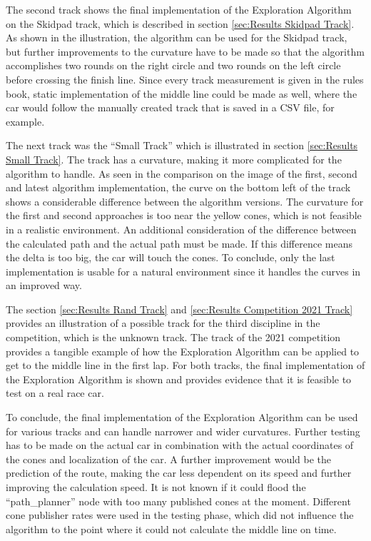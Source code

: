 The second track shows the final implementation of the Exploration Algorithm on the Skidpad track, which is described in section \ref{sec:Results Skidpad Track}. As shown in the illustration, the algorithm can be used for the Skidpad track, but further improvements to the curvature have to be made so that the algorithm accomplishes two rounds on the right circle and two rounds on the left circle before crossing the finish line. Since every track measurement is given in the rules book, static implementation of the middle line could be made as well, where the car would follow the manually created track that is saved in a CSV file, for example.

The next track was the ``Small Track'' which is illustrated in section \ref{sec:Results Small Track}. The track has a curvature, making it more complicated for the algorithm to handle. As seen in the comparison on the image of the first, second and latest algorithm implementation, the curve on the bottom left of the track shows a considerable difference between the algorithm versions. The curvature for the first and second approaches is too near the yellow cones, which is not feasible in a realistic environment. An additional consideration of the difference between the calculated path and the actual path must be made. If this difference means the delta is too big, the car will touch the cones. To conclude, only the last implementation is usable for a natural environment since it handles the curves in an improved way.

The section \ref{sec:Results Rand Track} and \ref{sec:Results Competition 2021 Track} provides an illustration of a possible track for the third discipline in the competition, which is the unknown track. The track of the 2021 competition provides a tangible example of how the Exploration Algorithm can be applied to get to the middle line in the first lap. For both tracks, the final implementation of the Exploration Algorithm is shown and provides evidence that it is feasible to test on a real race car.

To conclude, the final implementation of the Exploration Algorithm can be used for various tracks and can handle narrower and wider curvatures. Further testing has to be made on the actual car in combination with the actual coordinates of the cones and localization of the car. A further improvement would be the prediction of the route, making the car less dependent on its speed and further improving the calculation speed. It is not known if it could flood the ``path\_planner'' node with too many published cones at the moment. Different cone publisher rates were used in the testing phase, which did not influence the algorithm to the point where it could not calculate the middle line on time.

